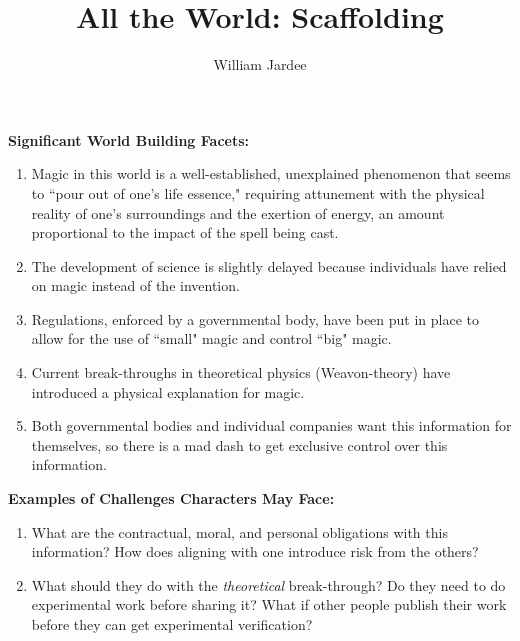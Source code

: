 \documentclass[12pt]{article}
\begin{document}

\title{All the World: Scaffolding}
\author{William Jardee}
\maketitle

\textbf{Significant World Building Facets:}
\begin{enumerate}
\item Magic in this world is a well-established, unexplained phenomenon that seems to ``pour out of one's life essence," requiring attunement with the physical reality of one's surroundings and the exertion of energy, an amount proportional to the impact of the spell being cast. 
\item The development of science is slightly delayed because individuals have relied on magic instead of the invention.
\item Regulations, enforced by a governmental body, have been put in place to allow for the use of ``small" magic and control ``big" magic.
\item Current break-throughs in theoretical physics (Weavon-theory) have introduced a physical explanation for magic. 
\item Both governmental bodies and individual companies want this information for themselves, so there is a mad dash to get exclusive control over this information.
\end{enumerate}

\textbf{Examples of Challenges Characters May Face:}
\begin{enumerate}
\item What are the contractual, moral, and personal obligations with this information? How does aligning with one introduce risk from the others?
\item What should they do with the {\sl theoretical} break-through? Do they need to do experimental work before sharing it? What if other people publish their work before they can get experimental verification? 
\end{enumerate}
\end{document}
